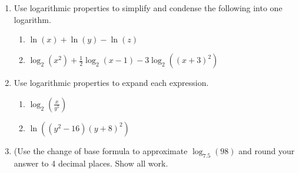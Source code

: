 

\begin{enumerate}
\item Use logarithmic properties to simplify and condense the following into one logarithm.
\begin{enumerate}
\item $\ln(x)+\ln(y)-\ln(z)$
\vfill
\item $\displaystyle \log_2(x^2)+\frac{1}{2}\log_2(x-1)-3\log_2((x+3)^2)$
\vfill

\end{enumerate}


\item Use logarithmic properties to expand each expression.  
\begin{enumerate}
\item $\displaystyle \log_2\left(\frac{x}{y^5}\right)$
\vfill
\item $\displaystyle \ln \left((y^2-16)(y+8)^2  \right)$
\vfill

\end{enumerate}

\item (Use the change of base formula to approximate $\log_{7.5}(98)$ and round your answer to 4 decimal places.  Show all work.
\vfill







\end{enumerate}



